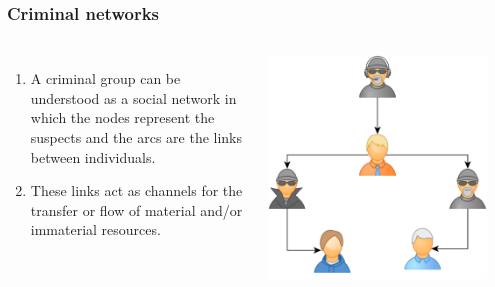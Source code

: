 \documentclass[aspectratio=169]{beamer}
\begin{document}
\begin{frame}
\frametitle{Criminal networks}
  \begin{columns}
    \begin{enumerate}
      \item A criminal group can be understood as a social network in which the nodes represent the suspects and the arcs are the links between individuals.
      \item These links act as channels for the transfer or flow of material and/or immaterial resources. \cite{Mci99}
    \end{enumerate}
    \centering
    \includegraphics[width=0.9\textwidth]{images/CG.pdf}
  \end{columns}
\end{frame}
\end{document}
